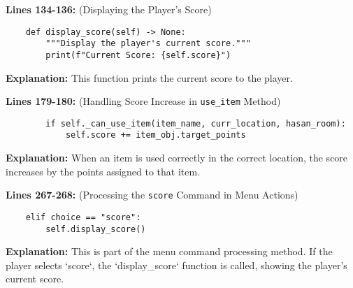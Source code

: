 \documentclass[11pt]{article}
\begin{document}
\noindent\textbf{Lines 134-136:} (Displaying the Player's Score)
\begin{verbatim}
    def display_score(self) -> None:
        """Display the player's current score."""
        print(f"Current Score: {self.score}")
\end{verbatim}
\textbf{Explanation:} This function prints the current score to the player.

\noindent\textbf{Lines 179-180:} (Handling Score Increase in \texttt{use\_item} Method)
\begin{verbatim}
        if self._can_use_item(item_name, curr_location, hasan_room):
            self.score += item_obj.target_points
\end{verbatim}
\textbf{Explanation:} When an item is used correctly in the correct location, the score increases by the points
assigned to that item.

\noindent\textbf{Lines 267-268:} (Processing the \texttt{score} Command in Menu Actions)
\begin{verbatim}
    elif choice == "score":
        self.display_score()
\end{verbatim}
\textbf{Explanation:} This is part of the menu command processing method. If the player selects `score`,
the `display\_score` function is called, showing the player's current score.
\end{document}
